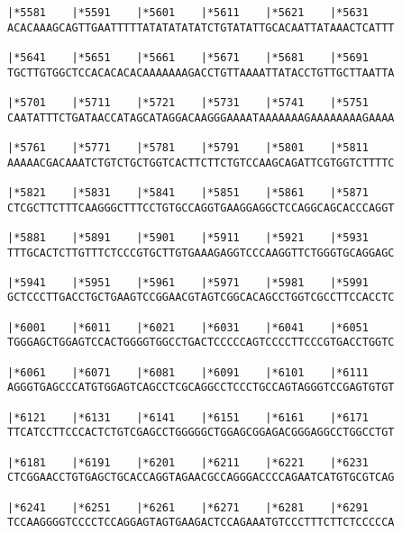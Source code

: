 \documentclass{article}
\begin{document}
\begin{Verbatim}
|*5581    |*5591    |*5601    |*5611    |*5621    |*5631    
ACACAAAGCAGTTGAATTTTTATATATATATCTGTATATTGCACAATTATAAACTCATTT
                                                            
|*5641    |*5651    |*5661    |*5671    |*5681    |*5691    
TGCTTGTGGCTCCACACACACAAAAAAAGACCTGTTAAAATTATACCTGTTGCTTAATTA
                                                            
|*5701    |*5711    |*5721    |*5731    |*5741    |*5751    
CAATATTTCTGATAACCATAGCATAGGACAAGGGAAAATAAAAAAAGAAAAAAAAGAAAA
                                                            
|*5761    |*5771    |*5781    |*5791    |*5801    |*5811    
AAAAACGACAAATCTGTCTGCTGGTCACTTCTTCTGTCCAAGCAGATTCGTGGTCTTTTC
                                                            
|*5821    |*5831    |*5841    |*5851    |*5861    |*5871    
CTCGCTTCTTTCAAGGGCTTTCCTGTGCCAGGTGAAGGAGGCTCCAGGCAGCACCCAGGT
                                                            
|*5881    |*5891    |*5901    |*5911    |*5921    |*5931    
TTTGCACTCTTGTTTCTCCCGTGCTTGTGAAAGAGGTCCCAAGGTTCTGGGTGCAGGAGC
                                                            
|*5941    |*5951    |*5961    |*5971    |*5981    |*5991    
GCTCCCTTGACCTGCTGAAGTCCGGAACGTAGTCGGCACAGCCTGGTCGCCTTCCACCTC
                                                            
|*6001    |*6011    |*6021    |*6031    |*6041    |*6051    
TGGGAGCTGGAGTCCACTGGGGTGGCCTGACTCCCCCAGTCCCCTTCCCGTGACCTGGTC
                                                            
|*6061    |*6071    |*6081    |*6091    |*6101    |*6111    
AGGGTGAGCCCATGTGGAGTCAGCCTCGCAGGCCTCCCTGCCAGTAGGGTCCGAGTGTGT
                                                            
|*6121    |*6131    |*6141    |*6151    |*6161    |*6171    
TTCATCCTTCCCACTCTGTCGAGCCTGGGGGCTGGAGCGGAGACGGGAGGCCTGGCCTGT
                                                            
|*6181    |*6191    |*6201    |*6211    |*6221    |*6231    
CTCGGAACCTGTGAGCTGCACCAGGTAGAACGCCAGGGACCCCAGAATCATGTGCGTCAG
                                                            
|*6241    |*6251    |*6261    |*6271    |*6281    |*6291    
TCCAAGGGGTCCCCTCCAGGAGTAGTGAAGACTCCAGAAATGTCCCTTTCTTCTCCCCCA
                                                            

\end{Verbatim}
\end{document}
